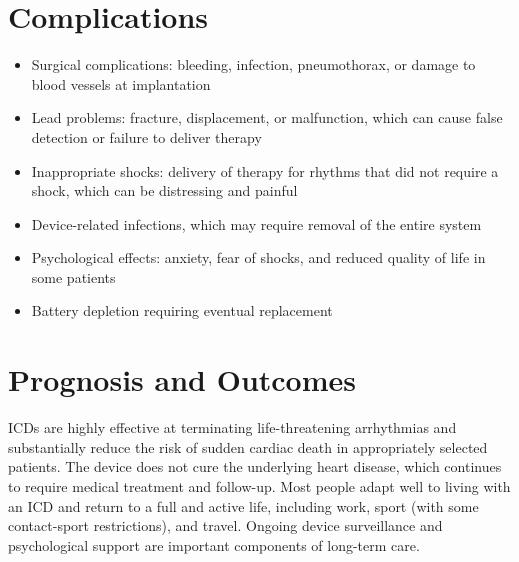 \section*{Complications}
\begin{itemize}
    \item Surgical complications: bleeding, infection, pneumothorax, or damage to blood vessels at implantation
    \item Lead problems: fracture, displacement, or malfunction, which can cause false detection or failure to deliver therapy
    \item Inappropriate shocks: delivery of therapy for rhythms that did not require a shock, which can be distressing and painful
    \item Device-related infections, which may require removal of the entire system
    \item Psychological effects: anxiety, fear of shocks, and reduced quality of life in some patients
    \item Battery depletion requiring eventual replacement
\end{itemize}

\section*{Prognosis and Outcomes}
ICDs are highly effective at terminating life-threatening arrhythmias and substantially reduce the risk of sudden cardiac death in appropriately selected patients. The device does not cure the underlying heart disease, which continues to require medical treatment and follow-up. Most people adapt well to living with an ICD and return to a full and active life, including work, sport (with some contact-sport restrictions), and travel. Ongoing device surveillance and psychological support are important components of long-term care.

